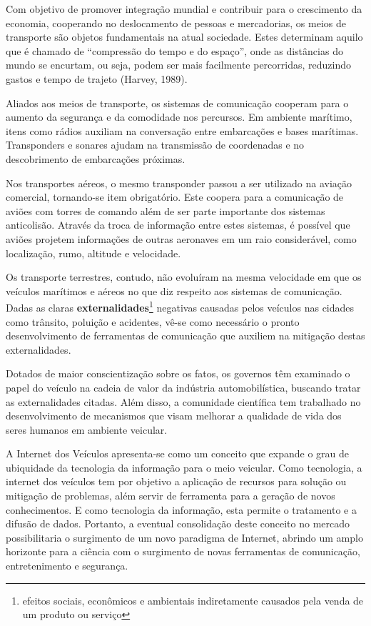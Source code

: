 \documentclass[
12pt,				%
openright,			%
oneside,			%
a4paper,			%
brazil,				%
]{abntex2}
\begin{document}
	
	\par Com objetivo de promover integração mundial e contribuir para o crescimento da economia, cooperando no deslocamento de pessoas e mercadorias, os meios de transporte são objetos fundamentais na atual sociedade. Estes determinam aquilo que é chamado de “compressão do tempo e do espaço”, onde as distâncias do mundo se encurtam, ou seja, podem ser mais facilmente percorridas, reduzindo gastos e tempo de trajeto (Harvey, 1989).
	
	\par Aliados aos meios de transporte, os sistemas de comunicação cooperam para o aumento da segurança e da comodidade nos percursos. Em ambiente marítimo, itens como rádios auxiliam na conversação entre embarcações e bases marítimas. Transponders e sonares ajudam na transmissão de coordenadas e no descobrimento de embarcações próximas. 
	
	\par Nos transportes aéreos, o mesmo transponder passou a ser utilizado na aviação comercial, tornando-se item obrigatório. Este coopera para a comunicação de aviões com torres de comando além de ser parte importante dos sistemas anticolisão. Através da troca de informação entre estes sistemas, é possível que aviões projetem informações de outras aeronaves em um raio considerável, como localização, rumo, altitude e velocidade.
	
	\par Os transporte terrestres, contudo, não evoluíram na mesma velocidade em que os veículos marítimos e aéreos no que diz respeito aos sistemas de comunicação. Dadas as claras \textbf{externalidades}{\footnote{efeitos sociais, econômicos e ambientais indiretamente causados pela venda de um produto ou serviço}} negativas causadas pelos veículos nas cidades como trânsito, poluição e acidentes, vê-se como necessário o pronto desenvolvimento de ferramentas de comunicação que auxiliem na mitigação destas externalidades.

	\par Dotados de maior conscientização sobre os fatos, os governos têm examinado o papel do veículo na cadeia de valor da indústria automobilística, buscando tratar as externalidades citadas. Além disso, a comunidade científica tem trabalhado no desenvolvimento de mecanismos que visam melhorar a qualidade de vida dos seres humanos em ambiente veicular. 
	
	\par A Internet dos Veículos apresenta-se como um conceito que expande o grau de ubiquidade da tecnologia da informação para o meio veicular. Como tecnologia, a internet dos veículos tem por objetivo a aplicação de recursos para solução ou mitigação de problemas, além servir de ferramenta para a geração de novos conhecimentos. E como tecnologia da informação, esta permite o tratamento e a difusão de dados. Portanto, a eventual consolidação deste conceito no mercado possibilitaria o surgimento de um novo paradigma de Internet, abrindo um amplo horizonte para a ciência com o surgimento de novas ferramentas de comunicação, entretenimento e segurança.
	
\end{document}
